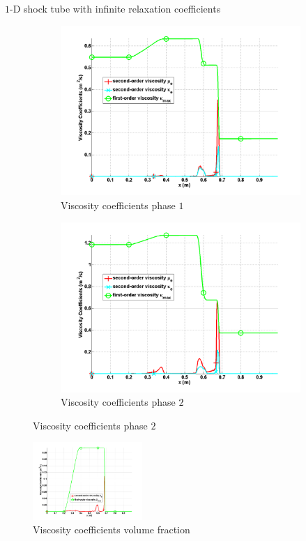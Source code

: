 \documentclass[xcolor=dvipsnames,10pt]{beamer}
\begin{document}
\begin{frame}{$1$-D shock tube with infinite relaxation coefficients}
\begin{figure}
        \begin{subfigure}[b]{0.37\textwidth}
                \centering
                \includegraphics[width=\textwidth]{../figures/SEM/relaxation_two_phases_liquid_viscosity_kappa_mu.png}
                \caption{Viscosity coefficients phase $1$}
        \end{subfigure}%
        \begin{subfigure}[b]{0.37\textwidth}
                \centering
                \includegraphics[width=\textwidth]{../figures/SEM/relaxation_two_phases_vapor_viscosity_kappa_mu.png}
                \caption{Viscosity coefficients phase $2$}
        \end{subfigure}%
\end{figure}
\begin{figure}[H]        
\centering
\includegraphics[width=0.37\textwidth]{../figures/SEM/relaxation_two_phases_liquid_beta.png}
\caption{Viscosity coefficients volume fraction}
\end{figure}
\end{frame}
\end{document}
